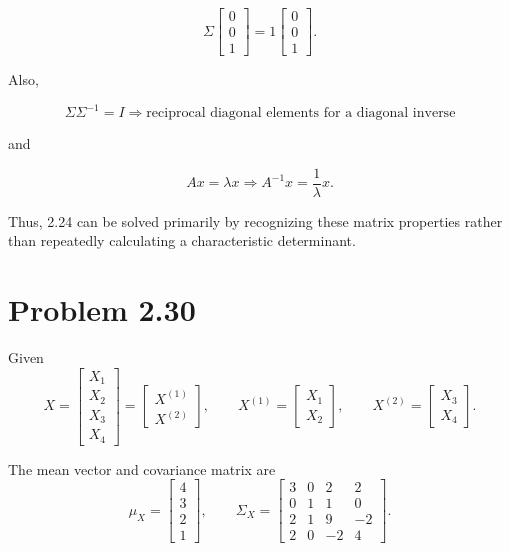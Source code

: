 \documentclass[12pt]{article}
\begin{document}
	\[
	\Sigma
	\begin{bmatrix}
		0\\0\\1
	\end{bmatrix}
	=
	1
	\begin{bmatrix}
		0\\0\\1
	\end{bmatrix}.
	\]
	
	Also,
	
	\[
	\boxed{
		\Sigma\Sigma^{-1}=I
		\Rightarrow
		\text{reciprocal diagonal elements for a diagonal inverse}
	}
	\]
	
	and
	
	\[
	\boxed{
		Ax=\lambda x
		\Rightarrow
		A^{-1}x=\frac{1}{\lambda}x
	}.
	\]
	
	Thus, 2.24 can be solved primarily by recognizing these
	matrix properties rather than repeatedly calculating a
	characteristic determinant.

	\section*{Problem 2.30}
	
	Given
	\[
	X=
	\begin{bmatrix}
		X_1\\
		X_2\\
		X_3\\
		X_4
	\end{bmatrix}
	=
	\begin{bmatrix}
		X^{(1)}\\
		X^{(2)}
	\end{bmatrix},
	\qquad
	X^{(1)}=
	\begin{bmatrix}
		X_1\\
		X_2
	\end{bmatrix},
	\qquad
	X^{(2)}=
	\begin{bmatrix}
		X_3\\
		X_4
	\end{bmatrix}.
	\]
	
	The mean vector and covariance matrix are
	\[
	\mu_X=
	\begin{bmatrix}
		4\\
		3\\
		2\\
		1
	\end{bmatrix},
	\qquad
	\Sigma_X=
	\begin{bmatrix}
		3&0&2&2\\
		0&1&1&0\\
		2&1&9&-2\\
		2&0&-2&4
	\end{bmatrix}.
	\]
	
\end{document}
